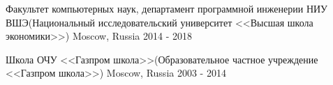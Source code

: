 


\begin{cventries}
\cventry
{Факультет компьютерных наук, департамент программной инженерии} %
{НИУ ВШЭ(Национальный исследовательский университет <<Высшая школа экономики>>)} %
{Moscow, Russia} %
{2014 - 2018} %
{ %
}


\cventry
{Школа}
{ОЧУ <<Газпром школа>>(Образовательное частное учреждение <<Газпром школа>>)} %
{Moscow, Russia} %
{2003 - 2014} %
{ %
}


\end{cventries}
